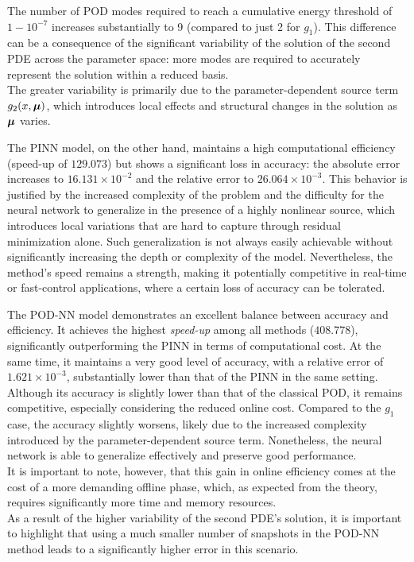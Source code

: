 \documentclass[
    conference,
    nofonttune,
    11pt
]{IEEEtran}
\begin{document}
            The number of POD modes required to reach a cumulative energy threshold of $1 - 10^{-7}$ increases substantially to 9 (compared to just 2 for $g_1$). This difference can be a consequence of the significant variability of the solution of the second PDE across the parameter space: more modes are required to accurately represent the solution within a reduced basis.\\ The greater variability is primarily due to the parameter-dependent source term $g_2(x,{\boldsymbol\mu})$, which introduces local effects and structural changes in the solution as ${\boldsymbol\mu}$ varies. 
            
            The PINN model, on the other hand, maintains a high computational efficiency (speed-up of $129.073$) but shows a significant loss in accuracy: the absolute error increases to $16.131 \times 10^{-2}$ and the relative error to $26.064 \times 10^{-3}$. This behavior is justified by the increased complexity of the problem and the difficulty for the neural network to generalize in the presence of a highly nonlinear source, which introduces local variations that are hard to capture through residual minimization alone. Such generalization is not always easily achievable without significantly increasing the depth or complexity of the model. Nevertheless, the method’s speed remains a strength, making it potentially competitive in real-time or fast-control applications, where a certain loss of accuracy can be tolerated.

            The POD-NN model demonstrates an excellent balance between accuracy and efficiency. It achieves the highest \textit{speed-up} among all methods ($408.778$), significantly outperforming the PINN in terms of computational cost. At the same time, it maintains a very good level of accuracy, with a relative error of $1.621 \times 10^{-3}$, substantially lower than that of the PINN in the same setting. Although its accuracy is slightly lower than that of the classical POD, it remains competitive, especially considering the reduced online cost. Compared to the $g_1$ case, the accuracy slightly worsens, likely due to the increased complexity introduced by the parameter-dependent source term. Nonetheless, the neural network is able to generalize effectively and preserve good performance.\\ It is important to note, however, that this gain in online efficiency comes at the cost of a more demanding offline phase, which, as expected from the theory, requires significantly more time and memory resources.\\ As a result of the higher variability of the second PDE's solution, it is important to highlight that using a much smaller number of snapshots in the POD-NN method leads to a significantly higher error in this scenario.
            
\end{document}
